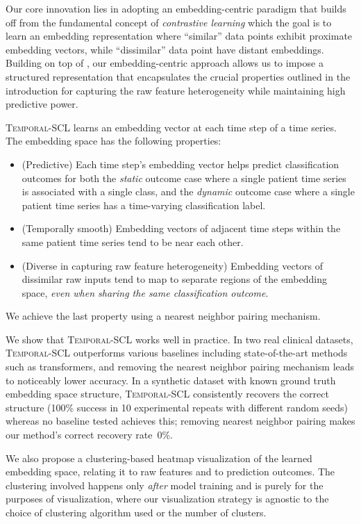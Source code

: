 \documentclass[pmlr,twocolumn,10pt]{jmlr} %
\begin{document}
Our core innovation lies in adopting an embedding-centric paradigm that builds off from the fundamental concept of \emph{contrastive learning} \citep{le2020contrastive} which the goal is to learn an embedding representation where ``similar'' data points exhibit proximate embedding vectors, while ``dissimilar'' data point have distant embeddings. Building on top of \cite{khosla2020supervised}, our embedding-centric approach allows us to impose a structured representation that encapsulates the crucial properties outlined in the introduction for capturing the raw feature heterogeneity while maintaining high predictive power.

\textsc{Temporal-SCL} learns an embedding vector at each time step of a time series. The embedding space has the following properties:
\begin{itemize}[itemsep=0pt,topsep=0pt,parsep=0pt,partopsep=0em,leftmargin=*]
\item[$\bullet$] (Predictive) Each time step's embedding vector helps predict classification outcomes for both the \emph{static} outcome case where a single patient time series is associated with a single class, and the \emph{dynamic} outcome case where a single patient time series has a time-varying classification label.
\item[$\bullet$] (Temporally smooth) Embedding vectors of adjacent time steps within the same patient time series tend to be near each other.
\item[$\bullet$] (Diverse in capturing raw feature heterogeneity) Embedding vectors of dissimilar raw inputs tend to map to separate regions of the embedding space, \emph{even when sharing the same classification outcome}.
\end{itemize}
We achieve the last property using a nearest neighbor pairing mechanism.

We show that \textsc{Temporal-SCL} works well in practice. In two real clinical datasets, \textsc{Temporal-SCL} outperforms various baselines including state-of-the-art methods such as transformers, and removing the nearest neighbor pairing mechanism leads to noticeably lower accuracy. In a synthetic dataset with known ground truth embedding space structure, \mbox{\textsc{Temporal-SCL}} consistently recovers the correct structure (100\% success in 10 experimental repeats with different random seeds) whereas no baseline tested achieves this; removing nearest neighbor pairing makes our method's correct recovery rate~0\%.

We also propose a clustering-based heatmap visualization of the learned embedding space, relating it to raw features and to prediction outcomes. The clustering involved happens only \emph{after} model training and is purely for the purposes of visualization, where our visualization strategy is agnostic to the choice of clustering algorithm used or the number of clusters.
\end{document}

